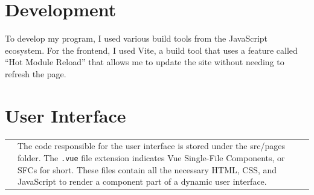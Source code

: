 \documentclass[notitlepage, 12pt]{report}
\newcommand{\code}[1]{\texttt{#1}}
\begin{document}
\section*{Development}
To develop my program, I used various build tools from the JavaScript ecosystem.
For the frontend, I used Vite, a build tool that uses a feature called ``Hot Module Reload'' that allows me to update the site without needing to refresh the page.

\section*{User Interface}
\begin{xltabular}{\textwidth}{
		@{}
		p{0.3\textwidth}
		X
	}
	\centerline{}
	&
	The code responsible for the user interface is stored under the src/pages folder.
	The \code{.vue} file extension indicates Vue Single-File Components, or SFCs for short.
	These files contain all the necessary HTML, CSS, and JavaScript to render a component part of a dynamic user interface.
\end{xltabular}

\vspace{10pt}
\end{document}
